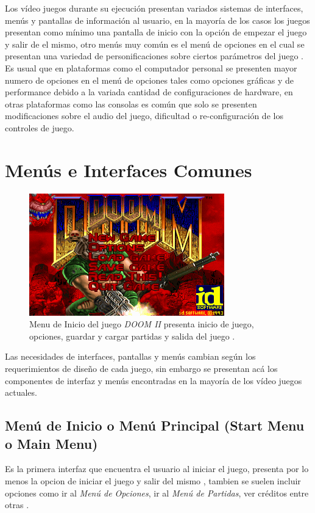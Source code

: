 Los vídeo juegos durante su ejecución presentan variados sistemas de interfaces, menús y pantallas de información al usuario, en la mayoría de los casos los juegos presentan como mínimo una pantalla de inicio con la opción de empezar el juego y salir de el mismo, otro menús muy común es el menú de  opciones en el cual se presentan una variedad de personificaciones sobre ciertos parámetros del juego \cite{gb_optionsmenu}. Es usual que en plataformas como el computador personal se presenten mayor numero de opciones en el menú de opciones tales como opciones gráficas y de performance debido a la variada cantidad de configuraciones de hardware, en otras plataformas como las consolas es común que solo se presenten modificaciones sobre el audio del juego, dificultad o re-configuración de los controles de juego.

\section{Menús e Interfaces Comunes}
\setlength\intextsep{0pt}
\begin{figure}
\includegraphics[width=\linewidth]{media/doom_start.png}
\caption{Menu de Inicio del juego \emph{DOOM II} presenta inicio de juego, opciones, guardar y cargar partidas y salida del juego \cite{doomii}.}
\label{fig:doom}
\end{figure}
Las necesidades de interfaces, pantallas y menús cambian según los requerimientos de diseño de cada juego, sin embargo se presentan acá los componentes de interfaz y menús encontradas en la mayoría de los vídeo juegos actuales.
\subsection{Menú de Inicio o Menú Principal (Start Menu o Main Menu)}
Es la primera interfaz que encuentra el usuario al iniciar el juego, presenta por lo menos la opcion de iniciar el juego y salir del mismo \cite[p.~28]{jenkinscreatinggames}, tambien se suelen incluir opciones como ir al \emph{Menú de Opciones}, ir al \emph{Menú de Partidas}, ver créditos entre otras \cite{mainmenu}.~\\

